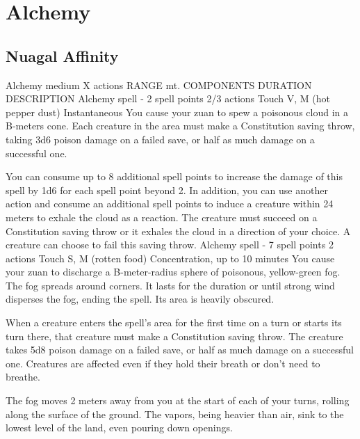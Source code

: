 \section{Alchemy}
\subsection*{Nuagal Affinity}
        {Alchemy medium}
        {X actions}
        {RANGE mt.}
        {COMPONENTS}
        {DURATION}
        DESCRIPTION
        {Alchemy spell - 2 spell points}
        {2/3 actions}
        {Touch}
        {V, M (hot pepper dust)}
        {Instantaneous}
        You cause your zuan to spew a poisonous cloud in a B-meters cone.
        Each creature in the area must make a Constitution saving throw, taking 3d6 poison damage on a failed save, or half as much damage on a successful one.

        You can consume up to 8 additional spell points to increase the damage of this spell by 1d6 for each spell point beyond 2.
        In addition, you can use another action and consume an additional spell points to induce a creature within 24 meters to exhale the cloud as a reaction.
        The creature must succeed on a Constitution saving throw or it exhales the cloud in a direction of your choice.
        A creature can choose to fail this saving throw.
        {Alchemy spell - 7 spell points}
        {2 actions}
        {Touch}
        {S, M (rotten food)}
        {Concentration, up to 10 minutes}
        You cause your zuan to discharge a B-meter-radius sphere of poisonous, yellow-green fog.
        The fog spreads around corners.
        It lasts for the duration or until strong wind disperses the fog, ending the spell.
        Its area is heavily obscured.

        When a creature enters the spell's area for the first time on a turn or starts its turn there, that creature must make a Constitution saving throw.
        The creature takes 5d8 poison damage on a failed save, or half as much damage on a successful one.
        Creatures are affected even if they hold their breath or don't need to breathe.

        The fog moves 2 meters away from you at the start of each of your turns, rolling along the surface of the ground.
        The vapors, being heavier than air, sink to the lowest level of the land, even pouring down openings.


